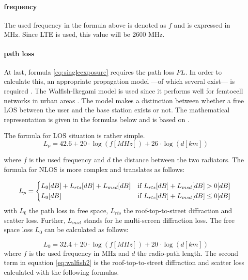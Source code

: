 \paragraph{frequency}
The used frequency in the formula above is denoted as $f$ and is expressed in MHz. Since LTE is used, this value will be 2600 MHz.

\paragraph{path loss}
\label{subsec:pl}
At last, formula \ref{eq:singleexposure} requires the path loss $PL$. In order to calculate this, an appropriate propagation model ---of which several exist--- is required .
The Walfish-Ikegami model is used since it performs well for femtocell networks in urban areas \cite{J2}. 
The model makes a distinction between whether a free \gls{LOS} between the user and the base station exists or not.
The mathematical representation is given in the formulas below and is based on \cite{J34,J35}.

The formula for \gls{LOS} situation is rather simple.
\begin{equation}
L_{p}=42.6+20\cdot\log(f [MHz])+26\cdot\log(d[km])
\end{equation}

where $f$ is the used frequency and $d$ the distance between the two radiators.
The formula for \gls{NLOS} is more complex and translates as follows:

\begin{equation}
L_p=
\begin{cases*}
  L_{0} [dB] + L_{rts} [dB] + L_{msd} [dB]    & if $L_{rts}[dB] + L_{msd}[dB] > 0[dB]$ \\
L_{0}  [dB]                        &  if $L_{rts}[dB] + L_{msd}[dB] \leq 0[dB]$\\
\end{cases*}
\label{eq:walfish2}
\end{equation}
with $L_0$ the path loss in free space, $L_{rts}$ the roof-top-to-street diffraction and scatter loss.
Further, $L_{msd}$ stands for he multi-screen diffraction loss. The free space loss $L_0$ can be calculated as follows:

\begin{equation}
L_{0}=32.4+20\cdot\log(f [MHz])+20\cdot\log(d[km])
\end{equation}
where $f$ is the used frequency in MHz and $d$ the radio-path length.
The second term in equation \ref{eq:walfish2} is the roof-top-to-street diffraction and scatter loss
calculated with the following formulas.

